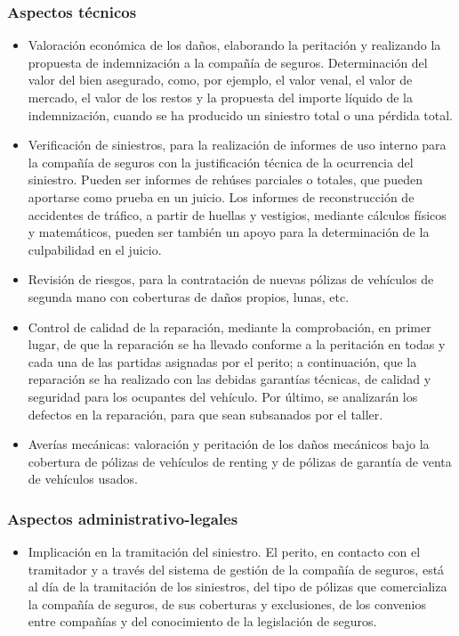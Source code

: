 \subsubsection{Aspectos técnicos}
\begin{itemize}

\item Valoración económica de los daños, elaborando la peritación y realizando la propuesta de indemnización a la compañía de seguros. Determinación del valor del bien asegurado, como, por ejemplo, el
valor venal, el valor de mercado, el valor de los restos y la propuesta del importe líquido de la indemnización, cuando se ha producido un siniestro total o una pérdida total.

\item Verificación de siniestros, para la realización de informes de uso interno para la compañía de seguros con la justificación técnica de la ocurrencia del siniestro. Pueden ser informes de rehúses parciales o totales, que pueden aportarse como prueba en un juicio. Los informes de reconstrucción de accidentes de tráfico, a partir de huellas y vestigios, mediante cálculos físicos y matemáticos, pueden ser también un apoyo para la determinación de la culpabilidad en el juicio. 

\item Revisión de riesgos, para la contratación de nuevas pólizas de vehículos de segunda mano con coberturas de daños propios, lunas, etc.

\item Control de calidad de la reparación, mediante la comprobación, en primer lugar, de que la reparación se ha llevado conforme a la peritación en todas y cada una de las partidas asignadas por el perito; a continuación, que la reparación se ha realizado con las debidas garantías técnicas, de calidad y seguridad para los ocupantes del vehículo. Por último, se analizarán los defectos en la reparación, para que sean subsanados por el taller.

\item Averías mecánicas: valoración y peritación de los daños mecánicos bajo la cobertura de pólizas de vehículos de renting y de pólizas de garantía de venta de vehículos usados.

\end{itemize}


\subsubsection{Aspectos administrativo-legales}
\begin{itemize}

\item Implicación en la tramitación del siniestro. El perito, en contacto con el tramitador y a través del sistema de gestión de la compañía de seguros, está al día de la tramitación de los siniestros, del tipo de pólizas que comercializa la compañía de seguros, de sus coberturas y exclusiones, de los convenios entre compañías y del conocimiento de la legislación de seguros.

\end{itemize}

